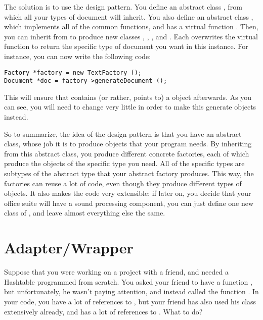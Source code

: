 The solution is to use the  design pattern. You define
an abstract class , from which all your types of
document will inherit. You also define an abstract class
, which implements all of the common functions, and has
a virtual function .
Then, you can inherit from  to produce new classes
, , ,
and . Each overwrites the virtual function
 to return the specific type of document you
want in this instance. For instance, you can now write the following
code:

\begin{verbatim}
Factory *factory = new TextFactory ();
Document *doc = factory->generateDocument ();
\end{verbatim}

This will ensure that  contains (or rather, points to) a
 object afterwards. As you can see, you will need
to change very little in order to make this generate
 objects instead.

So to summarize, the idea of the  design pattern is that
you have an abstract  class, whose job it is to produce
objects that your program needs. By inheriting from this abstract
class, you produce different concrete factories, each of which produce
the objects of the specific type you need. All of the specific types
are subtypes of the abstract type that your abstract factory
produces. This way, the factories can reuse a lot of code, even though
they produce different types of objects. It also makes the code very
extensible: if later on, you decide that your office suite will have a
sound processing component, you can just define one new class of
, and leave almost everything else the same.

\section{Adapter/Wrapper}
Suppose that you were working on a project with a friend, and needed a
Hashtable programmed from scratch. You asked your friend to have a
function ,
but unfortunately, he wasn't paying attention, and instead called the
function .
In your code, you have a lot of references to , but your
friend has also used his class extensively already, and has a lot of
references to . What to do?

